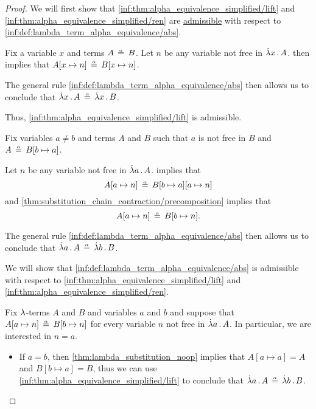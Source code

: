 \begin{proof}
  \SufficiencySubProof We will first show that \ref{inf:thm:alpha_equivalence_simplified/lift} and \ref{inf:thm:alpha_equivalence_simplified/ren} are \hyperref[con:inference_rule_admissibility]{admissible} with respect to \ref{inf:def:lambda_term_alpha_equivalence/abs}.

   Fix a variable \( x \) and terms \( A \aequiv B \). Let \( n \) be any variable not free in \( \qabs x A \).  then implies that \( A[x \mapsto n] \aequiv B[x \mapsto n] \).

  The general rule \ref{inf:def:lambda_term_alpha_equivalence/abs} then allows us to conclude that \( \qabs x A \aequiv \qabs x B \).

  Thus, \ref{inf:thm:alpha_equivalence_simplified/lift} is admissible.

   Fix variables \( a \neq b \) and terms \( A \) and \( B \) such that \( a \) is not free in \( B \) and \( A \aequiv B[b \mapsto a] \).

  Let \( n \) be any variable not free in \( \qabs a A \).  implies that
  \begin{equation*}
    A[a \mapsto n] \aequiv B[b \mapsto a][a \mapsto n]
  \end{equation*}
  and \cref{thm:substitution_chain_contraction/precomposition} implies that
  \begin{equation*}
    A[a \mapsto n] \aequiv B[b \mapsto n].
  \end{equation*}

  The general rule \ref{inf:def:lambda_term_alpha_equivalence/abs} then allows us to conclude that \( \qabs a A \aequiv \qabs b B \).

  \NecessitySubProof We will show that \ref{inf:def:lambda_term_alpha_equivalence/abs} is admissible with respect to \ref{inf:thm:alpha_equivalence_simplified/lift} and \ref{inf:thm:alpha_equivalence_simplified/ren}.

  Fix \( {\mathrm \lambda} \)-terms \( A \) and \( B \) and variables \( a \) and \( b \) and suppose that \( A[a \mapsto n] \aequiv B[b \mapsto n] \) for every variable \( n \) not free in \( \qabs a A \). In particular, we are interested in \( n = a \).

  \begin{itemize}
    \item If \( a = b \), then \cref{thm:lambda_substitution_noop} implies that \( A[a \mapsto a] = A \) and \( B[b \mapsto a] = B \), thus we can use \ref{inf:thm:alpha_equivalence_simplified/lift} to conclude that \( \qabs a A \aequiv \qabs b B \).


\end{itemize}
\end{proof}
